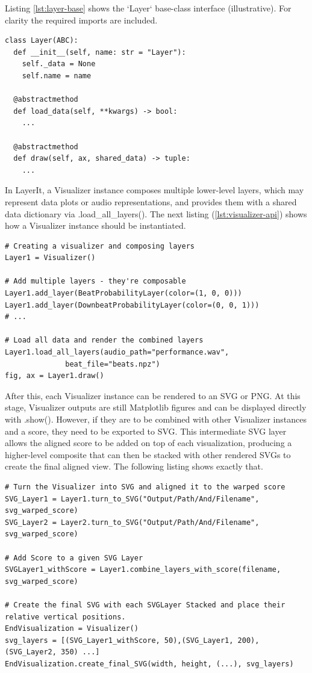 Listing \ref{lst:layer-base} shows the `Layer` base-class interface (illustrative). For clarity the required imports are included.

\begin{lstlisting}[caption={Layer interface (concise)},label={lst:layer-base}]
class Layer(ABC):
  def __init__(self, name: str = "Layer"):
    self._data = None
    self.name = name

  @abstractmethod
  def load_data(self, **kwargs) -> bool:
    ...

  @abstractmethod
  def draw(self, ax, shared_data) -> tuple:
    ...
\end{lstlisting}

In LayerIt, a Visualizer instance composes multiple lower-level layers, which may represent data plots or audio representations, and provides them with a shared data dictionary via .load\_all\_layers(). The next listing (\ref{lst:visualizer-api}) shows how a Visualizer instance should be instantiated.

\begin{lstlisting}[caption={Visualizer Instance Composition},label={lst:visualizer-api}]
# Creating a visualizer and composing layers
Layer1 = Visualizer()

# Add multiple layers - they're composable
Layer1.add_layer(BeatProbabilityLayer(color=(1, 0, 0)))
Layer1.add_layer(DownbeatProbabilityLayer(color=(0, 0, 1)))
# ... 

# Load all data and render the combined layers
Layer1.load_all_layers(audio_path="performance.wav", 
              beat_file="beats.npz")
fig, ax = Layer1.draw()
\end{lstlisting}

After this, each Visualizer instance can be rendered to an SVG or PNG. At this stage, Visualizer outputs are still Matplotlib figures and can be displayed directly with .show(). However, if they are to be combined with other Visualizer instances and a score, they need to be exported to SVG. This intermediate SVG layer allows the aligned score to be added on top of each visualization, producing a higher-level composite that can then be stacked with other rendered SVGs to create the final aligned view. The following listing shows exactly that. 

\begin{lstlisting}[caption={Simplified workings for SVG layers.},label={lst:visualizer-api}]
# Turn the Visualizer into SVG and aligned it to the warped score
SVG_Layer1 = Layer1.turn_to_SVG("Output/Path/And/Filename", svg_warped_score)
SVG_Layer2 = Layer2.turn_to_SVG("Output/Path/And/Filename", svg_warped_score)

# Add Score to a given SVG Layer
SVGLayer1_withScore = Layer1.combine_layers_with_score(filename, svg_warped_score)

# Create the final SVG with each SVGLayer Stacked and place their relative vertical positions.
EndVisualization = Visualizer()
svg_layers = [(SVG_Layer1_withScore, 50),(SVG_Layer1, 200), (SVG_Layer2, 350) ...]
EndVisualization.create_final_SVG(width, height, (...), svg_layers)
\end{lstlisting}

